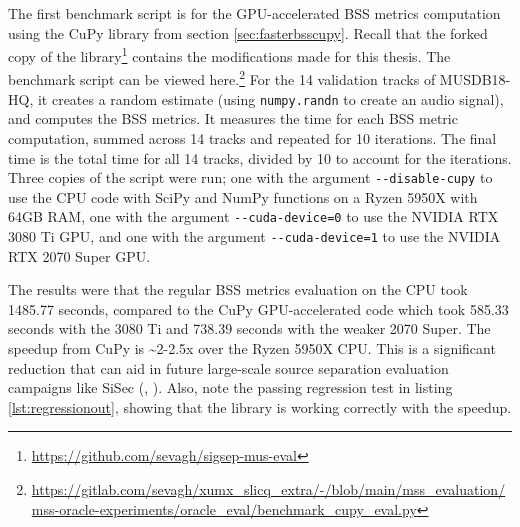 \documentclass[report.tex]{subfiles}
\begin{document}
The first benchmark script is for the GPU-accelerated BSS metrics computation using the CuPy library from section \ref{sec:fasterbsscupy}. Recall that the forked copy of the library\footnote{\url{https://github.com/sevagh/sigsep-mus-eval}} contains the modifications made for this thesis. The benchmark script can be viewed here.\footnote{\url{https://gitlab.com/sevagh/xumx_slicq_extra/-/blob/main/mss_evaluation/mss-oracle-experiments/oracle_eval/benchmark_cupy_eval.py}} For the 14 validation tracks of MUSDB18-HQ, it creates a random estimate (using \Verb#numpy.randn# to create an audio signal), and computes the BSS metrics. It measures the time for each BSS metric computation, summed across 14 tracks and repeated for 10 iterations. The final time is the total time for all 14 tracks, divided by 10 to account for the iterations. Three copies of the script were run; one with the argument \Verb#--disable-cupy# to use the CPU code with SciPy and NumPy functions on a Ryzen 5950X with 64GB RAM, one with the argument \Verb#--cuda-device=0# to use the NVIDIA RTX 3080 Ti GPU, and one with the argument \Verb#--cuda-device=1# to use the NVIDIA RTX 2070 Super GPU.

The results were that the regular BSS metrics evaluation on the CPU took 1485.77 seconds, compared to the CuPy GPU-accelerated code which took 585.33 seconds with the 3080 Ti and 738.39 seconds with the weaker 2070 Super. The speedup from CuPy is \textasciitilde 2-2.5x over the Ryzen 5950X CPU. This is a significant reduction that can aid in future large-scale source separation evaluation campaigns like SiSec (\cite{sisec2016}, \cite{sisec2018}). Also, note the passing regression test in listing \ref{lst:regressionout}, showing that the library is working correctly with the speedup.
\end{document}
